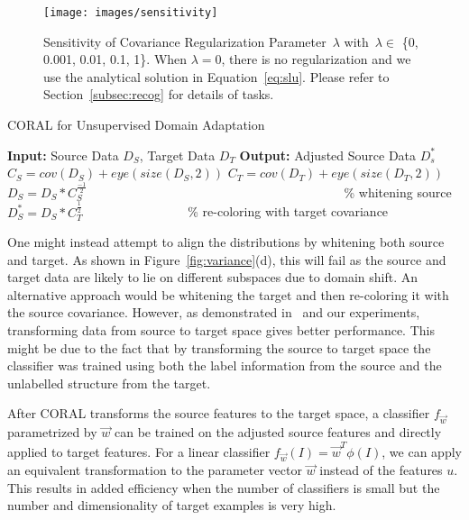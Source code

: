 \documentclass[letterpaper]{article}
\newcommand{\wSrc}{\vec{w}}
\begin{document}
\begin{figure}
\centering
\texttt{[image: images/sensitivity]}
\vspace{-0.2in}
\caption{\small Sensitivity of Covariance Regularization Parameter~$\lambda$ with~$\lambda \in$ \{0, 0.001, 0.01, 0.1, 1\}. When $\lambda = 0$, there is no regularization and we use the analytical solution in Equation~\eqref{eq:slu}. Please refer to Section~\ref{subsec:recog} for details of tasks.}
\label{fig:sens}
\end{figure}

\begin{algorithm}
\caption{CORAL for Unsupervised Domain Adaptation}
\begin{small}
\begin{algorithmic} 
\STATE \textbf{Input:} Source Data $D_S$, Target Data $D_T$
\STATE \textbf{Output:} Adjusted Source Data $D_{s}^{*}$
\STATE $C_S = cov(D_S) + eye(size(D_S, 2))$
\STATE $C_T = cov(D_T) + eye(size(D_T, 2))$
\STATE $D_S = D_S*C_S^{\frac{-1}{2}}$  ~~~~~~~~~~~~~~~~~~~~~~~~~~~~~~~~~~~~~~~~\% whitening source
\STATE $D_{S}^{*} = D_S*C_T^{\frac{1}{2}}$  ~~~~~~~~~~~~~~~~\% re-coloring with target covariance
\end{algorithmic} 
\end{small}
\label{alg:coral}
\end{algorithm}

One might instead attempt to align the distributions by whitening both source and target. As shown in Figure~\ref{fig:variance}(d), this will fail as the source and target data are likely to lie on different subspaces due to domain shift. An alternative approach would be whitening the target and then re-coloring it with the source covariance. However, as demonstrated in~\cite{outlooks,sasb} and our experiments, transforming data from source to target space gives better performance. 
This might be due to the fact that by transforming the source to target space the classifier was trained using both the label information from the source and the unlabelled structure from the target.

After CORAL transforms the source features to the target space, a classifier $f_{\wSrc}$ parametrized by $\wSrc$ can be trained on the adjusted source features and directly applied to target features. For a linear classifier 
$f_{\wSrc}(I) =  \wSrc^T \phi(I)$,
we can apply an equivalent transformation to the parameter vector $\wSrc$ instead of the features $u$. This results in added efficiency when the number of classifiers is small but the number and dimensionality of target examples is very high.
\end{document}
